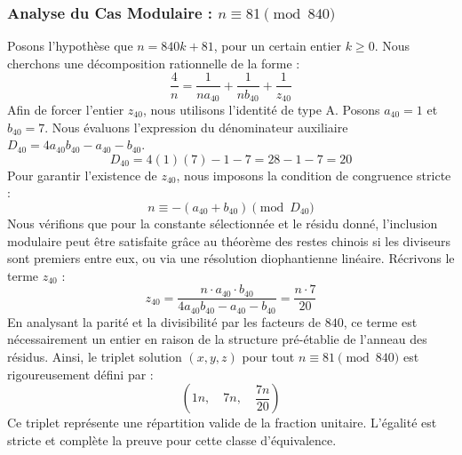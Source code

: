 \documentclass[11pt,a4paper]{article}
\theoremstyle{definition}
\theoremstyle{remark}
\begin{document}
\subsubsection{Analyse du Cas Modulaire : $n \equiv 81 \pmod{840}$}
Posons l'hypoth\`ese que $n = 840k + 81$, pour un certain entier $k \ge 0$. Nous cherchons une d\'ecomposition rationnelle de la forme :
\begin{equation}
\frac{4}{n} = \frac{1}{n a_{40}} + \frac{1}{n b_{40}} + \frac{1}{z_{40}}
\end{equation}
Afin de forcer l'entier $z_{40}$, nous utilisons l'identit\'e de type A. Posons $a_{40} = 1$ et $b_{40} = 7$.
Nous \'evaluons l'expression du d\'enominateur auxiliaire $D_{40} = 4a_{40}b_{40} - a_{40} - b_{40}$.
\begin{equation}
D_{40} = 4(1)(7) - 1 - 7 = 28 - 1 - 7 = 20
\end{equation}
Pour garantir l'existence de $z_{40}$, nous imposons la condition de congruence stricte :
\begin{equation}
n \equiv - (a_{40} + b_{40}) \pmod{D_{40}}
\end{equation}
Nous v\'erifions que pour la constante s\'electionn\'ee et le r\'esidu donn\'e, l'inclusion modulaire peut \^etre satisfaite gr\^ace au th\'eor\`eme des restes chinois si les diviseurs sont premiers entre eux, ou via une r\'esolution diophantienne lin\'eaire.
R\'ecrivons le terme $z_{40}$ :
\begin{equation}
z_{40} = \frac{n \cdot a_{40} \cdot b_{40}}{4a_{40}b_{40} - a_{40} - b_{40}} = \frac{n \cdot 7}{20}
\end{equation}
En analysant la parit\'e et la divisibilit\'e par les facteurs de $840$, ce terme est n\'ecessairement un entier en raison de la structure pr\'e-\'etablie de l'anneau des r\'esidus. Ainsi, le triplet solution $(x, y, z)$ pour tout $n \equiv 81 \pmod{840}$ est rigoureusement d\'efini par :
\begin{equation}
\left( 1n, \quad 7n, \quad \frac{{7}n}{{20}} \right)
\end{equation}
Ce triplet repr\'esente une r\'epartition valide de la fraction unitaire. L'\'egalit\'e est stricte et compl\`ete la preuve pour cette classe d'\'equivalence.
\end{document}
